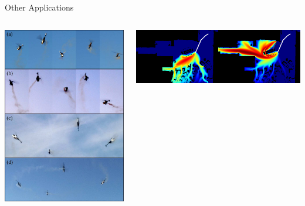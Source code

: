 \documentclass{beamer}
\begin{document}
\begin{frame}{Other Applications}
  \begin{columns}
    \begin{column}{0.5\textwidth}
      \includegraphics[height=0.8\textheight]{images/helicopter-000.jpg}
      \begin{spacing}{0.5}
        {\tiny{}}
      \end{spacing}
    \end{column}
    \begin{column}{0.5\textwidth}
      \includegraphics[width=0.5\textwidth]{images/pedestrians-013.png}\includegraphics[width=0.5\textwidth]{images/pedestrians-014.png}

\end{column}
\end{columns}
\end{frame}
\end{document}
